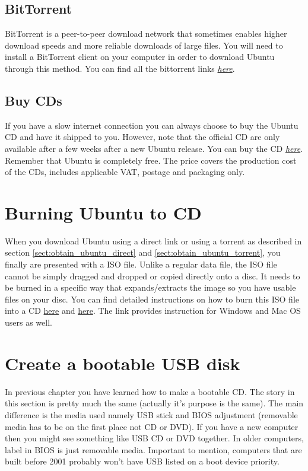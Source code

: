 \subsection*{BitTorrent} \label{sect:obtain_ubuntu_torrent} 
BitTorrent is a peer-to-peer download network that sometimes enables higher download speeds and more reliable downloads of large files. You will need to install a BitTorrent client on your computer in order to download Ubuntu through this method. You can find all the bittorrent links \href{http://www.ubuntu.com/download/ubuntu/alternative-download}{\textit{here}}.

\subsection*{Buy CDs} \label{sect:obtain_ubuntu_buycd} 
If you have a slow internet connection you can always choose to buy the Ubuntu CD and have it shipped to you. However, note that the official CD are only available after a few weeks after a new Ubuntu release. You can buy the CD \href{http://www.ubuntu.com/download/ubuntu/cds}{\textit{here}}. Remember that Ubuntu is completely free. The price covers the production cost of the CDs, includes applicable VAT, postage and packaging only.

\section{Burning Ubuntu to CD} 
When you download Ubuntu using a direct link or using a torrent as described in section \ref{sect:obtain_ubuntu_direct} and \ref{sect:obtain_ubuntu_torrent}, you finally are presented with a ISO file. Unlike a regular data file, the ISO file cannot be simply dragged and dropped or copied directly onto a disc. It needs to be burned in a specific way that expands/extracts the image so you have usable files on your disc. You can find detailed instructions on how to burn this ISO file into a CD \href{https://help.ubuntu.com/community/BurningIsoHowto}{here} and \href{http://www.ubuntu.com/download/ubuntu/download}{here}. The link provides instruction for Windows and Mac OS users as well.

\section{Create a bootable USB disk} 
In previous chapter you have learned how to make a bootable CD. The story in this section is pretty much the same (actually it's purpose is the same).  The main difference is the media used namely USB stick and BIOS adjustment (removable media has to be on the first place not CD or DVD). If you have a new computer then you might see something like USB CD or DVD  together. In older computers, label in BIOS  is just removable media.  Important to mention, computers that are built before 2001 probably won't have USB listed on a boot device priority. \\

